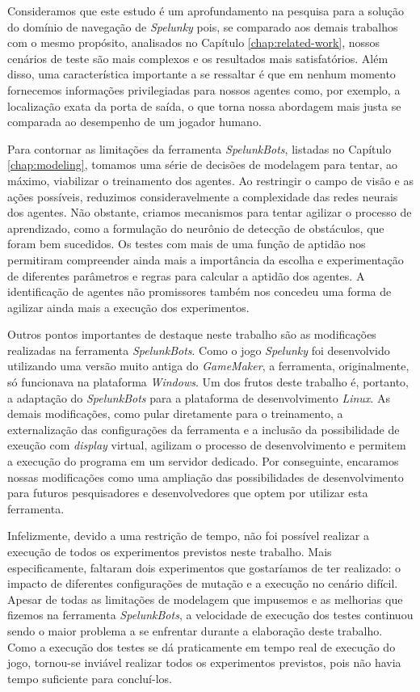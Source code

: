 Consideramos que este estudo é um aprofundamento na pesquisa para a solução do
domínio de navegação de \textit{Spelunky} pois, se comparado aos demais
trabalhos com o mesmo propósito, analisados no Capítulo \ref{chap:related-work},
nossos cenários de teste são mais complexos e os resultados mais satisfatórios.
Além disso, uma característica importante a se ressaltar é que em nenhum momento
fornecemos informações privilegiadas para nossos agentes como, por exemplo, a
localização exata da porta de saída, o que torna nossa abordagem mais justa se
comparada ao desempenho de um jogador humano.

Para contornar as limitações da ferramenta \textit{SpelunkBots}, listadas no
Capítulo \ref{chap:modeling}, tomamos uma série de decisões de modelagem para
tentar, ao máximo, viabilizar o treinamento dos agentes. Ao restringir o campo
de visão e as ações possíveis, reduzimos consideravelmente a complexidade das
redes neurais dos agentes. Não obstante, criamos mecanismos para tentar agilizar
o processo de aprendizado, como a formulação do neurônio de detecção de
obstáculos, que foram bem sucedidos. Os testes com mais de uma função de aptidão
nos permitiram compreender ainda mais a importância da escolha e experimentação
de diferentes parâmetros e regras para calcular a aptidão dos agentes. A
identificação de agentes não promissores também nos concedeu uma forma de
agilizar ainda mais a execução dos experimentos.

Outros pontos importantes de destaque neste trabalho são as modificações
realizadas na ferramenta \textit{SpelunkBots}. Como o jogo \textit{Spelunky} foi
desenvolvido utilizando uma versão muito antiga do \textit{GameMaker}, a
ferramenta, originalmente, só funcionava na plataforma \textit{Windows}. Um dos
frutos deste trabalho é, portanto, a adaptação do \textit{SpelunkBots} para a
plataforma de desenvolvimento \textit{Linux}. As demais modificações, como pular
diretamente para o treinamento, a externalização das configurações da ferramenta
e a inclusão da possibilidade de exeução com \textit{display} virtual, agilizam
o processo de desenvolvimento e permitem a execução do programa em um servidor
dedicado. Por conseguinte, encaramos nossas modificações como uma ampliação das
possibilidades de desenvolvimento para futuros pesquisadores e desenvolvedores
que optem por utilizar esta ferramenta.

Infelizmente, devido a uma restrição de tempo, não foi possível realizar a
execução de todos os experimentos previstos neste trabalho. Mais
especificamente, faltaram dois experimentos que gostaríamos de ter realizado: o
impacto de diferentes configurações de mutação e a execução no cenário difícil.
Apesar de todas as limitações de modelagem que impusemos e as melhorias que
fizemos na ferramenta \textit{SpelunkBots}, a velocidade de execução dos testes
continuou sendo o maior problema a se enfrentar durante a elaboração deste
trabalho. Como a execução dos testes se dá praticamente em tempo real de
execução do jogo, tornou-se inviável realizar todos os experimentos previstos,
pois não havia tempo suficiente para concluí-los.

